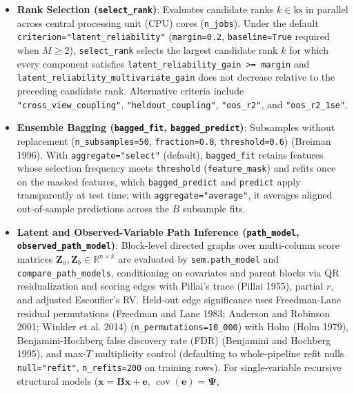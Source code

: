 \documentclass[
  10pt,
  letterpaper,
]{report}
\providecommand{\tightlist}{%
  \setlength{\itemsep}{0pt}\setlength{\parskip}{0pt}}
\begin{document}
\begin{itemize}
\tightlist
\item
  \textbf{Rank Selection (\texttt{select\_rank})}: Evaluates candidate
  ranks \(k \in \text{ks}\) in parallel across central processing unit
  (CPU) cores (\texttt{n\_jobs}). Under the default
  \texttt{criterion="latent\_reliability"} (\texttt{margin=0.2},
  \texttt{baseline=True} required when \(M \ge 2\)),
  \texttt{select\_rank} selects the largest candidate rank \(k\) for
  which every component satisfies
  \texttt{latent\_reliability\_gain\ \textgreater{}=\ margin} and
  \texttt{latent\_reliability\_multivariate\_gain} does not decrease
  relative to the preceding candidate rank. Alternative criteria include
  \texttt{"cross\_view\_coupling"}, \texttt{"heldout\_coupling"},
  \texttt{"oos\_r2"}, and \texttt{"oos\_r2\_1se"}.
\item
  \textbf{Ensemble Bagging (\texttt{bagged\_fit},
  \texttt{bagged\_predict})}: Subsamples without replacement
  (\texttt{n\_subsamples=50}, \texttt{fraction=0.8},
  \texttt{threshold=0.6}) (Breiman 1996). With
  \texttt{aggregate="select"} (default), \texttt{bagged\_fit} retains
  features whose selection frequency meets \texttt{threshold}
  (\texttt{feature\_mask}) and refits once on the masked features, which
  \texttt{bagged\_predict} and \texttt{predict} apply transparently at
  test time; with \texttt{aggregate="average"}, it averages aligned
  out-of-sample predictions across the \(B\) subsample fits.
\item
  \textbf{Latent and Observed-Variable Path Inference
  (\texttt{path\_model}, \texttt{observed\_path\_model})}: Block-level
  directed graphs over multi-column score matrices
  \(\mathbf{Z}_a, \mathbf{Z}_b \in \mathbb{R}^{n \times k}\) are
  evaluated by \texttt{sem.path\_model} and
  \texttt{compare\_path\_models}, conditioning on covariates and parent
  blocks via QR residualization and scoring edges with Pillai's trace
  (Pillai 1955), partial \(r\), and adjusted Escoufier's RV. Held-out
  edge significance uses Freedman-Lane residual permutations (Freedman
  and Lane 1983; Anderson and Robinson 2001; Winkler et al. 2014)
  (\texttt{n\_permutations=10\_000}) with Holm (Holm 1979),
  Benjamini-Hochberg false discovery rate (FDR) (Benjamini and Hochberg
  1995), and max-\(T\) multiplicity control (defaulting to
  whole-pipeline refit nulls \texttt{null="refit"},
  \texttt{n\_refits=200} on training rows). For single-variable
  recursive structural models
  (\(\mathbf{x} = \mathbf{B}\mathbf{x} + \mathbf{e}\),
  \(\operatorname{cov}(\mathbf{e}) = \boldsymbol{\Psi}\),

\end{itemize}
\end{document}
